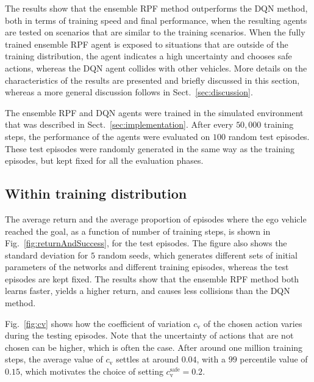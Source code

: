 The results show that the ensemble RPF method outperforms the DQN method, both in terms of training speed and final performance, when the resulting agents are tested on scenarios that are similar to the training scenarios. When the fully trained ensemble RPF agent is exposed to situations that are outside of the training distribution, the agent indicates a high uncertainty and chooses safe actions, whereas the DQN agent collides with other vehicles. More details on the characteristics of the results are presented and briefly discussed in this section, whereas a more general discussion follows in Sect.~\ref{sec:discussion}. %

The ensemble RPF and DQN agents were trained in the simulated environment that was described in Sect.~\ref{sec:implementation}. After every $50{,}000$ training steps, the performance of the agents were evaluated on $100$ random test episodes. These test episodes were randomly generated in the same way as the training episodes, but kept fixed for all the evaluation phases. %

\subsection{Within training distribution}
\label{sec:resultsWithinDistribution}

The average return and the average proportion of episodes where the ego vehicle reached the goal, as a function of number of training steps, is shown in Fig.~\ref{fig:returnAndSuccess}, for the test episodes. The figure also shows the standard deviation for $5$ random seeds, which generates different sets of initial parameters of the networks and different training episodes, whereas the test episodes are kept fixed. The results show that the ensemble RPF method both learns faster, yields a higher return, and causes less collisions than the DQN method. %
%

Fig.~\ref{fig:cv} shows how the coefficient of variation $c_\mathrm{v}$ of the chosen action varies during the testing episodes. Note that the uncertainty of actions that are not chosen can be higher, which is often the case. After around one million training steps, the average value of $c_\mathrm{v}$ settles at around $0.04$, with a $99$ percentile value of $0.15$, which motivates the choice of setting $c_\mathrm{v}^\mathrm{safe}=0.2$.

